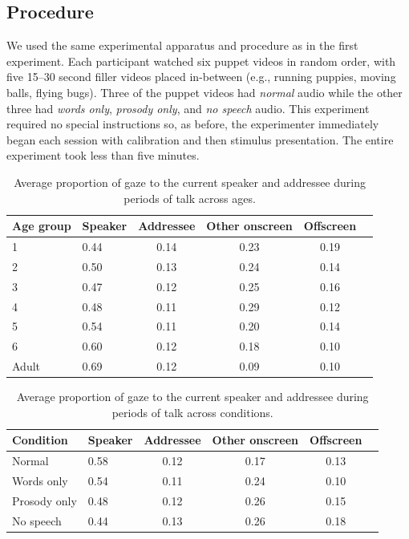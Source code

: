 \documentclass[authoryear, 12pt]{elsarticle}
\begin{document}
\subsection{Procedure}
We used the same experimental apparatus and procedure as in the first experiment. Each participant watched six puppet videos in random order, with five 15--30 second filler videos placed in-between (e.g., running puppies, moving balls, flying bugs). Three of the puppet videos had \textit{normal} audio while the other three had \textit{words only}, \textit{prosody only}, and \textit{no speech} audio. This experiment required no special instructions so, as before, the experimenter immediately began each session with calibration and then stimulus presentation. The entire experiment took less than five minutes.

\linespread{1}
\begin{table}[t]
\begin{center}
  \begin{tabular}{llcccc}
    \hline
    Age group & Speaker & Addressee & Other onscreen & Offscreen\\ 
    \hline
    1 & 0.44 & 0.14 & 0.23 & 0.19 \\ 
    2 & 0.50 & 0.13 & 0.24 & 0.14 \\ 
    3 & 0.47 & 0.12 & 0.25 & 0.16 \\ 
    4 & 0.48 & 0.11 & 0.29 & 0.12 \\ 
    5 & 0.54 & 0.11 & 0.20 & 0.14 \\ 
    6 & 0.60 & 0.12 & 0.18 & 0.10 \\
    Adult & 0.69 & 0.12 & 0.09 & 0.10 \\
    \hline
  \end{tabular}
\end{center}
  \caption{Average proportion of gaze to the current speaker and addressee during periods of talk across ages.}
\label{tab:look_e2}
\end{table}
\linespread{2}

\linespread{1}
\begin{table}
\begin{center}
  \begin{tabular}{llcccc}
    \hline
    Condition & Speaker & Addressee & Other onscreen & Offscreen\\ 
    \hline
    Normal 				& 0.58 & 0.12 & 0.17 & 0.13 \\ 
    Words only 		& 0.54 & 0.11 & 0.24 & 0.10 \\ 
    Prosody only 	& 0.48 & 0.12 & 0.26 & 0.15 \\ 
    No speech 		& 0.44 & 0.13 & 0.26 & 0.18 \\
    \hline
  \end{tabular}
\end{center}
  \caption{Average proportion of gaze to the current speaker and addressee during periods of talk across conditions.}
\label{tab:look_e2b}
\end{table}
\linespread{2}
\end{document}
